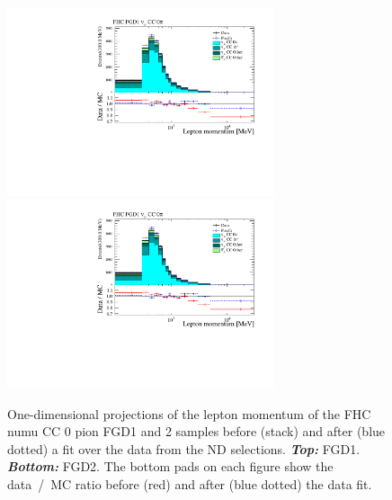 \begin{figure}[ht]
  \center
  \includegraphics[keepaspectratio=true,width=0.7\textwidth,page=1]{images/BANFF/reactionCodeStacks_PrefitAndPostfit_mom.pdf}\\
  \includegraphics[keepaspectratio=true,width=0.7\textwidth,page=4]{images/BANFF/reactionCodeStacks_PrefitAndPostfit_mom.pdf}\\
  \begin{center}
    \caption[FHC $\nu_\mu$ CC 0 pion FGD1 and 2 samples before and
    after a fit over the data from the ND280
    selections]{One-dimensional projections of the lepton momentum of
      the \Gls{FHC} \Gls{numu} \Gls{CC} 0 pion \Gls{FGD}1 and 2
      samples before (stack) and after (blue dotted) a fit over the
      data from the \Gls{ND} selections. \textbf{\textit{Top:}}
      \Gls{FGD}1. \textbf{\textit{Bottom:}} \Gls{FGD}2. The bottom
      pads on each figure show the data~/~\Gls{MC} ratio before (red)
      and after (blue dotted) the data fit.}
    \label{fig:numuCC0Pi}
  \end{center}
\end{figure}



